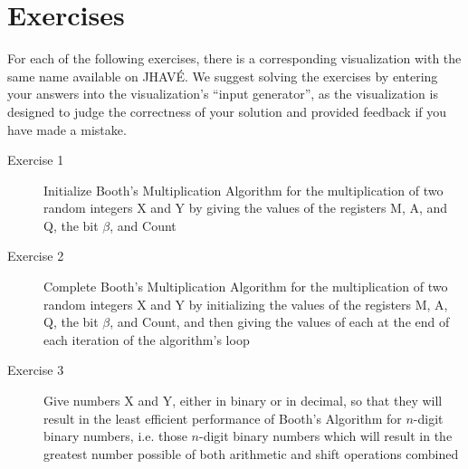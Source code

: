 \documentclass{article}
\begin{document}
\section{Exercises}
For each of the following exercises, there is a corresponding visualization with the same name available on JHAVÉ.
We suggest solving the exercises by entering your answers into the visualization's ``input generator'', as the visualization is designed to judge the correctness of your solution and provided feedback if you have made a mistake.

\begin{description}
    \item [Exercise 1] Initialize Booth's Multiplication Algorithm for the multiplication of two random integers X and Y by giving the values of the registers M, A, and Q, the bit $\beta$, and Count
    \item [Exercise 2] Complete Booth's Multiplication Algorithm for the multiplication of two random integers X and Y by initializing the values of the registers M, A, Q, the bit $\beta$, and Count, and then giving the values of each at the end of each iteration of the algorithm's loop
    \item [Exercise 3] Give numbers X and Y, either in binary or in decimal, so that they will result in the least efficient performance of Booth's Algorithm for $n$-digit binary numbers, i.e. those $n$-digit binary numbers which will result in the greatest number possible of both arithmetic and shift operations combined
\end{description}

\end{document}
